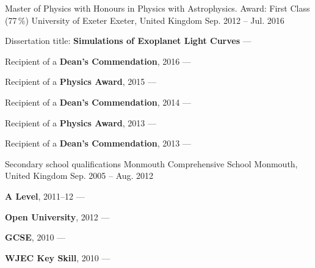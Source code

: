 \begin{cventries}
    \cventry
        {Master of Physics with Honours in Physics with Astrophysics. Award: First Class (77\,\%)} %
        {University of Exeter} %
        {Exeter, United Kingdom} %
        {Sep. 2012 -- Jul. 2016} %
        {
        \begin{cvitems} %
            \item {Dissertation title: \textbf{Simulations of Exoplanet Light Curves} --- }
            \vpaddingEdu
            \item {Recipient of a \textbf{Dean's Commendation}, 2016 --- }
            \vpaddingEdu
            \item {Recipient of a \textbf{Physics Award}, 2015 --- }
            \vpaddingEdu
            \item {Recipient of a \textbf{Dean's Commendation}, 2014 --- }
            \vpaddingEdu
            \item {Recipient of a \textbf{Physics Award}, 2013 --- }
            \vpaddingEdu
            \item {Recipient of a \textbf{Dean's Commendation}, 2013 --- }
        \end{cvitems}
        }

    \cventry
        {Secondary school qualifications}
        {Monmouth Comprehensive School}
        {Monmouth, United Kingdom}
        {Sep. 2005 -- Aug. 2012}
        {
        \begin{cvitems}
            \item {\textbf{A Level}, 2011--12 --- }
            \vpaddingEdu
            \item {\textbf{Open University}, 2012 --- }
            \vpaddingEdu
            \item {\textbf{GCSE}, 2010 --- }
            \vpaddingEdu
            \item {\textbf{WJEC Key Skill}, 2010 --- }
        \end{cvitems}
        }
\end{cventries}
